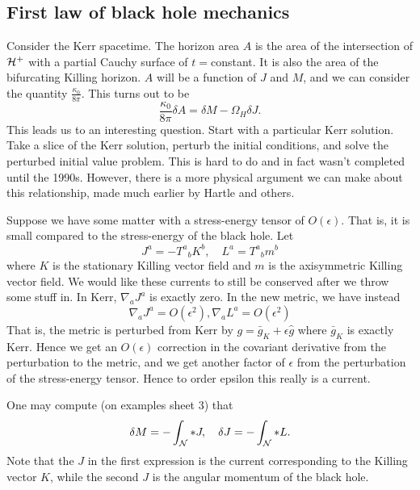 \subsection*{First law of black hole mechanics}
Consider the Kerr spacetime. The horizon area $A$ is the area of the intersection of $\mathcal H^+$ with a partial Cauchy surface of $t={}$constant. It is also the area of the bifurcating Killing horizon. $A$ will be a function of $J$ and $M$, and we can consider the quantity $\frac{\kappa_0}{8\pi}$. This turns out to be
\begin{equation}
    \frac{\kappa_0}{8\pi}\delta A = \delta M -\Omega_H \delta J.
\end{equation}
This leads us to an interesting question. Start with a particular Kerr solution. Take a slice of the Kerr solution, perturb the initial conditions, and solve the perturbed initial value problem. This is hard to do and in fact wasn't completed until the 1990s.%
However, there is a more physical argument we can make about this relationship, made much earlier by Hartle and others.

Suppose we have some matter with a stress-energy tensor of $O(\epsilon)$. That is, it is small compared to the stress-energy of the black hole. Let
\begin{equation}
    J^a = -T^a{}_b K^b,\quad L^a = T^a{}_b m^b
\end{equation}
where $K$ is the stationary Killing vector field and $m$ is the axisymmetric Killing vector field. We would like these currents to still be conserved after we throw some stuff in. In Kerr, $\nabla_a J^a$ is exactly zero. In the new metric, we have instead
\begin{equation}
    \nabla_a J^a = O(\epsilon^2), \nabla_a L^a = O(\epsilon^2)
\end{equation}
That is, the metric is perturbed from Kerr by $g=\bar g_K +\epsilon \hat g$ where $\bar g_K$ is exactly Kerr. Hence we get an $O(\epsilon)$ correction in the covariant derivative from the perturbation to the metric, and we get another factor of $\epsilon$ from the perturbation of the stress-energy tensor. Hence to order epsilon this really is a current.

One may compute (on examples sheet 3) that
\begin{equation}
    \delta M =-\int_\mathcal N * J, \quad \delta J = -\int_\mathcal N * L.
\end{equation}
Note that the $J$ in the first expression is the current corresponding to the Killing vector $K$, while the second $J$ is the angular momentum of the black hole.

